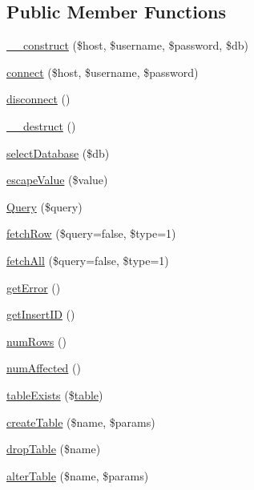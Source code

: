 \subsection*{Public Member Functions}
\begin{DoxyCompactItemize}
\item 
\hyperlink{class_my_s_q_li_database_a81fcddb424f13e0862ee3f7e1ea57ce9}{\_\-\_\-construct} (\$host, \$username, \$password, \$db)
\item 
\hyperlink{class_my_s_q_li_database_a4c4f3316747e665b9e02f6ddcba4117c}{connect} (\$host, \$username, \$password)
\item 
\hyperlink{class_my_s_q_li_database_abe175fcf658475bc56e9d6fa02bc88ec}{disconnect} ()
\item 
\hyperlink{class_my_s_q_li_database_a421831a265621325e1fdd19aace0c758}{\_\-\_\-destruct} ()
\item 
\hyperlink{class_my_s_q_li_database_ab624b0b234f9db9dbc6dc4180f566b1f}{selectDatabase} (\$db)
\item 
\hyperlink{class_my_s_q_li_database_a039ae2e8f2bf579fd75d9df8df87eee3}{escapeValue} (\$value)
\item 
\hyperlink{class_my_s_q_li_database_aebc962126fd37fd3478c4689156d5f83}{Query} (\$query)
\item 
\hyperlink{class_my_s_q_li_database_acdee1c4e55c3792b3dbfeedfac35912f}{fetchRow} (\$query=false, \$type=1)
\item 
\hyperlink{class_my_s_q_li_database_a1750ab2493620de034b80a77577f3e8b}{fetchAll} (\$query=false, \$type=1)
\item 
\hyperlink{class_my_s_q_li_database_a24ada5decce3d1b79cd82f5a90ccf404}{getError} ()
\item 
\hyperlink{class_my_s_q_li_database_ac73f1d8cddbdfc35ca442189378a073c}{getInsertID} ()
\item 
\hyperlink{class_my_s_q_li_database_af37433a300db1f607ee789d22828a0a0}{numRows} ()
\item 
\hyperlink{class_my_s_q_li_database_acac8dfe61e7840f9a1e672ebede0be21}{numAffected} ()
\item 
\hyperlink{class_my_s_q_li_database_ae7cdaa744d52a1eb0103e377023ca528}{tableExists} (\$\hyperlink{classtable}{table})
\item 
\hyperlink{class_my_s_q_li_database_a4b06dfe3bf7dd552f828a80fece817d8}{createTable} (\$name, \$params)
\item 
\hyperlink{class_my_s_q_li_database_a3471d37afdd3d76f5379dfe7364db0b6}{dropTable} (\$name)
\item 
\hyperlink{class_my_s_q_li_database_aa8cf3e2be109e548bed6980622fffb41}{alterTable} (\$name, \$params)
\end{DoxyCompactItemize}
